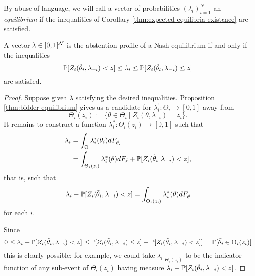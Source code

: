 By abuse of language, we will call a vector of probabilities $(\lambda_i)_{i=1}^N$ an \emph{equilibrium} if the inequalities of Corollary \ref{thm:expected-equilibria-existence} are satisfied.

\begin{corollary}
  \label{thm:expected-equilibria-existence}

  A vector $\lambda\in[0,1]^{\mathcal{N}}$ is the abstention profile of a Nash equilibrium if and only if the inequalities
  \[
    \mathbb{P}[Z_i(\tilde\theta_i,\lambda_{-i}) < z] \leq \lambda_i \leq \mathbb{P}[Z_i(\tilde\theta_i,\lambda_{-i}) \leq z]
  \]
  are satisfied.

\end{corollary}
%
\begin{proof}
  
  Suppose given $\lambda$ satisfying the desired inequalities.
  Proposition \ref{thm:bidder-equilibrium} gives us a candidate for $\lambda^*_i:\Theta_i\rightarrow[0,1]$ away from
  \[  
    \Theta_i(z_i):=\{\theta\in\Theta_i \mid Z_i(\theta,\lambda_{-i}) = z_i\}.
  \]
  It remains to construct a function $\lambda^*_i:\Theta_i(z_i)\rightarrow[0,1]$ such that
  \begin{align*}
    \lambda_i &= \int_{\Theta}\lambda_i^*(\theta_i) dF_{\tilde\theta_i} \\
    &= \int_{\Theta_i(z_i)} \lambda_i^*(\theta)dF_{\tilde\theta} + \mathbb{P}[Z_i(\tilde\theta_i,\lambda_{-i}) < z],
  \end{align*}
  that is, such that
  \[
    \lambda_i - \mathbb{P}[Z_i(\tilde\theta_i,\lambda_{-i}) < z] = \int_{\Theta_i(z_i)} \lambda_i^*(\theta)dF_{\tilde\theta}
  \]
  for each $i$.
  
  Since 
  \[
    0 \leq \lambda_i - \mathbb{P}[Z_i(\tilde\theta_i,\lambda_{-i}) < z] \leq \mathbb{P}[Z_i(\tilde\theta_i,\lambda_{-i}) \leq z] - \mathbb{P}[Z_i(\tilde\theta_i,\lambda_{-i}) < z] ]= \mathbb{P}[\tilde\theta_i\in \Theta_i(z_i)]
  \]
  this is clearly possible; for example, we could take $\lambda_i|_{\Theta_i(z_i)}$ to be the indicator function of any sub-event of $\Theta_i(z_i)$ having measure $\lambda_i - \mathbb{P}[Z_i(\tilde\theta_i,\lambda_{-i}) < z]$.
  \qedhere

\end{proof}


